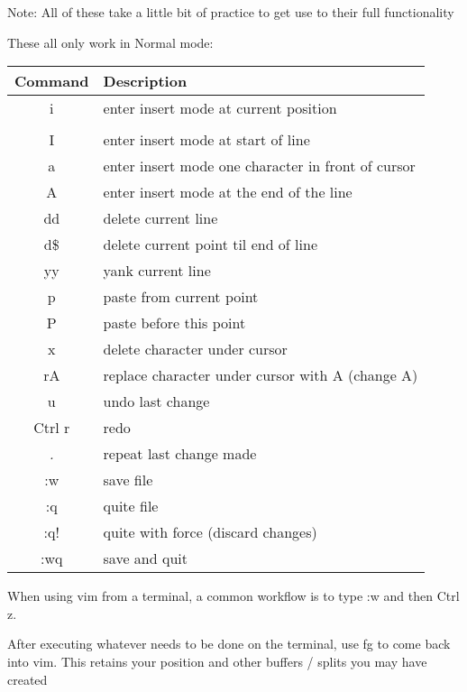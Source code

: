 \documentclass[12pt, letterpaper]{article}
\begin{document}
Note: All of these take a little bit of practice to get use to their full
functionality

These all only work in Normal mode:

\begin{table}[H]
    \begin{tabular}{|c|p{9cm}|}
        Command & Description \\
        \hline
        i & enter insert mode at current position \\
        \hline \\
        I & enter insert mode at start of line \\
        \hline
        a & enter insert mode one character in front of cursor \\
        \hline
        A & enter insert mode at the end of the line \\
        \hline
        dd & delete current line \\
        \hline
        d\$ & delete current point til end of line \\
        \hline
        yy & yank current line \\
        \hline
        p & paste from current point \\
        \hline
        P & paste before this point \\
        \hline
        x & delete character under cursor \\
        \hline
        rA & replace character under cursor with A (change A) \\
        \hline
        u & undo last change \\
        \hline
        Ctrl r & redo  \\
        \hline
        \textit{.} & repeat last change made  \\
        \hline
        :w & save file \\
        \hline
        :q & quite file \\
        \hline
        :q! & quite with force (discard changes) \\
        \hline
        :wq & save and quit \\
        \hline
    \end{tabular}
\end{table}

When using vim from a terminal, a common workflow is to type :w and then Ctrl
z.

After executing whatever needs to be done on the terminal, use fg to come back
into vim. This retains your position and other buffers / splits you may have
created
\end{document}
